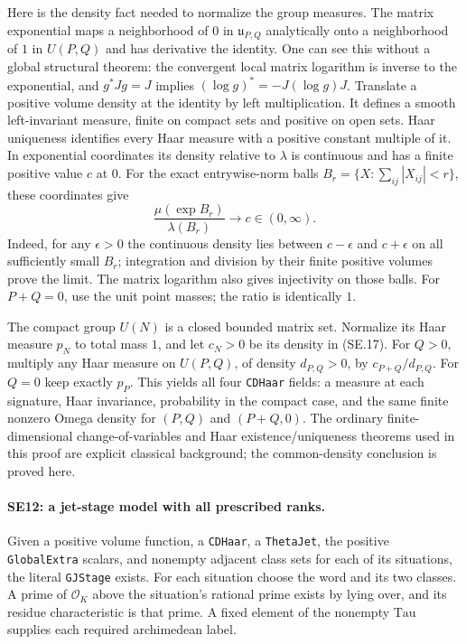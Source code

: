 Here is the density fact needed to normalize the group measures. The
matrix exponential maps a neighborhood of $0$ in
$\mathfrak u_{P,Q}$ analytically onto a neighborhood of $1$ in
$U(P,Q)$ and has derivative the identity. One can see this without a
global structural theorem: the convergent local matrix logarithm is
inverse to the exponential, and $g^*Jg=J$ implies
$(\log g)^*=-J(\log g)J$. Translate a positive volume density at the
identity by left multiplication. It defines a smooth left-invariant
measure, finite on compact sets and positive on open sets. Haar
uniqueness identifies every Haar measure with a positive constant
multiple of it. In exponential coordinates its density relative to
$\lambda$ is continuous and has a finite positive value $c$ at $0$.
For the exact entrywise-norm balls
$B_r=\{X:\sum_{ij}|X_{ij}|<r\}$, these coordinates give
\[
 \frac{\mu(\exp B_r)}{\lambda(B_r)}\longrightarrow c\in(0,\infty).
 \tag{SE.17}
\]
Indeed, for any $\epsilon>0$ the continuous density lies between
$c-\epsilon$ and $c+\epsilon$ on all sufficiently small $B_r$;
integration and division by their finite positive volumes prove the
limit. The matrix logarithm also gives injectivity on those balls.
For $P+Q=0$, use the unit point masses; the ratio is identically $1$.

The compact group $U(N)$ is a closed bounded matrix set. Normalize its
Haar measure $p_N$ to total mass $1$, and let $c_N>0$ be its density
in (SE.17). For $Q>0$, multiply any Haar measure on $U(P,Q)$, of
density $d_{P,Q}>0$, by $c_{P+Q}/d_{P,Q}$. For $Q=0$ keep exactly
$p_P$. This yields all four \texttt{CDHaar} fields: a measure at
each signature, Haar invariance, probability in the compact case,
and the same finite nonzero Omega density for $(P,Q)$ and $(P+Q,0)$.
The ordinary finite-dimensional change-of-variables and Haar
existence/uniqueness theorems used in this proof are explicit classical
background; the common-density conclusion is proved here.

\paragraph{SE12: a jet-stage model with all prescribed ranks.}
Given a positive volume function, a \texttt{CDHaar}, a
\texttt{ThetaJet}, the positive \texttt{GlobalExtra} scalars, and
nonempty adjacent class sets for each of its situations, the literal
\texttt{GJStage} exists. For each situation choose the word and its
two classes. A prime of $\mathcal O_K$ above the situation's rational
prime exists by lying over, and its residue characteristic is that
prime. A fixed element of the nonempty $\mathrm{Tau}$ supplies each
required archimedean label.


